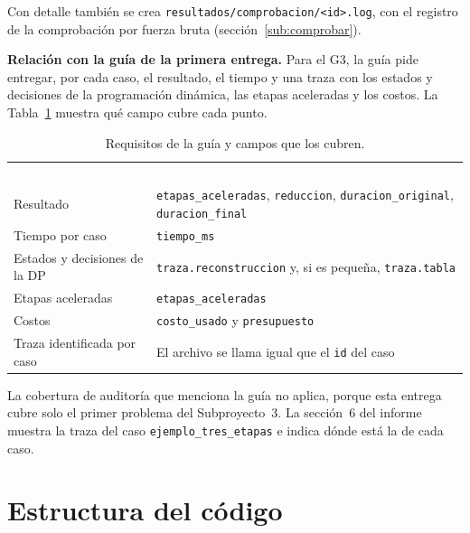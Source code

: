 \documentclass[11pt,a4paper]{article}
\newcommand{\cod}[1]{\texttt{#1}}
\newcommand{\encabezado}{\rowcolor{fondo}}
\newcommand{\blanco}[1]{\textcolor{white}{\textbf{#1}}}
\begin{document}
Con detalle también se crea \cod{resultados/comprobacion/<id>.log}, con el registro de la comprobación por fuerza bruta (sección~\ref{sub:comprobar}).

\textbf{Relación con la guía de la primera entrega.} Para el G3, la guía pide entregar, por cada caso, el resultado, el tiempo y una traza con los estados y decisiones de la programación dinámica, las etapas aceleradas y los costos. La Tabla~\ref{tab:guia} muestra qué campo cubre cada punto.

\begin{table}[H]
\centering\small
\renewcommand{\arraystretch}{1.2}
\begin{tabularx}{\textwidth}{@{}lX@{}}
\encabezado \blanco{Lo que pide la guía} & \blanco{Campo de la salida} \\
Resultado & \cod{etapas\_aceleradas}, \cod{reduccion}, \cod{duracion\_original}, \cod{duracion\_final} \\
Tiempo por caso & \cod{tiempo\_ms} \\
Estados y decisiones de la DP & \cod{traza.reconstruccion} y, si es pequeña, \cod{traza.tabla} \\
Etapas aceleradas & \cod{etapas\_aceleradas} \\
Costos & \cod{costo\_usado} y \cod{presupuesto} \\
Traza identificada por caso & El archivo se llama igual que el \cod{id} del caso \\
\bottomrule
\end{tabularx}
\caption{Requisitos de la guía y campos que los cubren.}
\label{tab:guia}
\end{table}

La cobertura de auditoría que menciona la guía no aplica, porque esta entrega cubre solo el primer problema del Subproyecto~3. La sección~6 del informe muestra la traza del caso \cod{ejemplo\_tres\_etapas} e indica dónde está la de cada caso.

\section{Estructura del código}
\label{sec:estructura}
\end{document}
